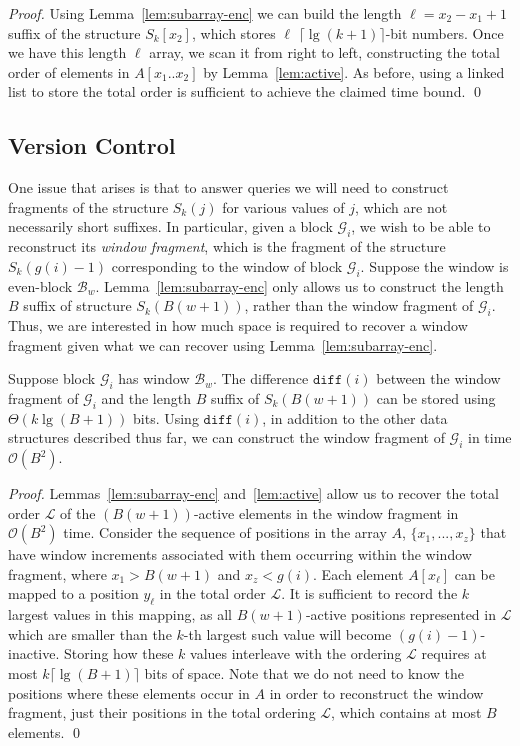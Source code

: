 \documentclass[runningheads]{llncs}
\newcommand{\Oh}{\mathcal{O}}
\begin{document}
\begin{proof}
Using Lemma~\ref{lem:subarray-enc} we can build the length $\ell =
x_2-x_1 +1$ suffix of the structure $S_k[x_2]$, which stores $\ell$
$\lceil \lg (k+1) \rceil$-bit numbers.  Once we have this length
$\ell$ array, we scan it from right to left, constructing the total
order of elements in $A[x_1 ..x_2]$ by Lemma~\ref{lem:active}.  As
before, using a linked list to store the total order is sufficient to
achieve the claimed time bound. \qed
\end{proof}

\subsection{Version Control}

One issue that arises is that to answer queries we will need to
construct fragments of the structure $S_k(j)$ for various values of
$j$, which are not necessarily short suffixes.  In particular, given a
block $\mathcal{G}_i$, we wish to be able to reconstruct its
\emph{window fragment}, which is the fragment of the structure
$S_k(g(i) - 1)$ corresponding to the window of block $\mathcal{G}_i$.
Suppose the window is even-block
$\mathcal{B}_w$. Lemma~\ref{lem:subarray-enc} only allows us to
construct the length $B$ suffix of structure $S_k(B(w+1))$, rather
than the window fragment of $\mathcal{G}_i$.  Thus, we are interested
in how much space is required to recover a window fragment given what
we can recover using Lemma~\ref{lem:subarray-enc}.

\begin{lemma}
Suppose block $\mathcal{G}_i$ has window $\mathcal{B}_w$.  The
difference $\texttt{diff}(i)$ between the window fragment of
$\mathcal{G}_i$ and the length $B$ suffix of $S_k(B(w+1))$ can be
stored using $\Theta(k \lg (B+1))$ bits.  Using $\texttt{diff}(i)$, in
addition to the other data structures described thus far, we can
construct the window fragment of $\mathcal{G}_i$ in time $\Oh(B^2)$.
\end{lemma}

\begin{proof}
Lemmas~\ref{lem:subarray-enc} and~\ref{lem:active} allow us to recover
the total order $\mathcal{L}$ of the $(B(w+1))$-active elements in the
window fragment in $\Oh(B^2)$ time.  Consider the sequence of
positions in the array $A$, $\{ x_1, ..., x_z \} $ that have window
increments associated with them occurring within the window fragment,
where $x_1 > B(w+1)$ and $x_z < g(i)$.  Each element $A[x_\ell]$ can
be mapped to a position $y_\ell$ in the total order $\mathcal{L}$.  It
is sufficient to record the $k$ largest values in this mapping, as all
$B(w+1)$-active positions represented in $\mathcal{L}$ which are
smaller than the $k$-th largest such value will become
$(g(i)-1)$-inactive.  Storing how these $k$ values interleave with the
ordering $\mathcal{L}$ requires at most $k \lceil \lg (B +1) \rceil$
bits of space.  Note that we do not need to know the positions where
these elements occur in $A$ in order to reconstruct the window
fragment, just their positions in the total ordering $\mathcal{L}$,
which contains at most $B$ elements. \qed
\end{proof}
\end{document}
